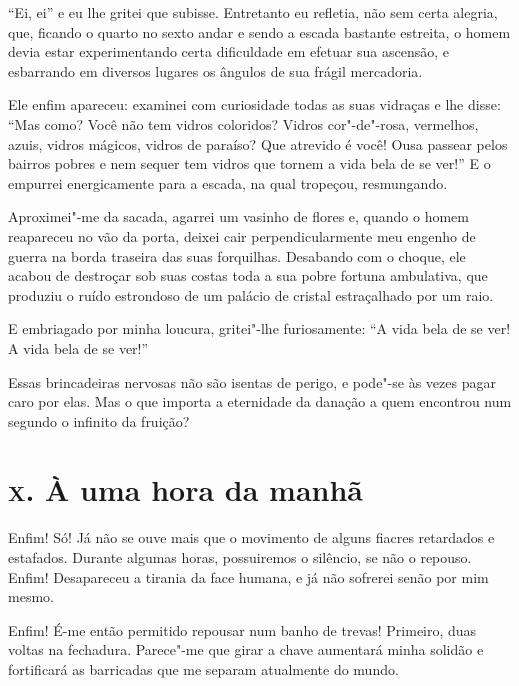 ``Ei, ei'' e eu lhe gritei que subisse.
Entretanto eu refletia, não sem certa alegria, que, ficando o quarto
no sexto andar e sendo a escada bastante estreita, o
homem devia estar experimentando certa dificuldade em efetuar sua
ascensão, e esbarrando em diversos lugares os ângulos de sua frágil
mercadoria.

Ele enfim apareceu: examinei com curiosidade todas as suas vidraças e
lhe disse: ``Mas como? Você não tem vidros coloridos?
Vidros cor"-de"-rosa, vermelhos, azuis, vidros mágicos, vidros de
paraíso? Que atrevido é você! Ousa passear pelos bairros pobres e nem
sequer tem vidros que tornem a vida bela de se ver!'' E
o empurrei energicamente para a escada, na qual tropeçou, resmungando.

Aproximei"-me da sacada, agarrei um vasinho de flores e, quando o
homem reapareceu no vão da porta, deixei cair perpendicularmente meu
engenho de guerra na borda traseira das suas forquilhas. Desabando
com o choque, ele acabou de destroçar sob suas costas toda a sua pobre
fortuna ambulativa, que produziu o ruído estrondoso de um palácio de
cristal estraçalhado por um raio.

E embriagado por minha loucura, gritei"-lhe furiosamente:
``A vida bela de se ver! A vida bela de se
ver!''

Essas brincadeiras nervosas não são isentas de perigo, e pode"-se às
vezes pagar caro por elas. Mas o que importa a eternidade da danação a
quem encontrou num segundo o infinito da fruição?

\chapter{\textsc{x.} À uma hora da manhã}

Enfim! Só! Já não se ouve mais que o movimento de alguns fiacres retardados
e estafados. Durante algumas horas, possuiremos o silêncio, se não o
repouso. Enfim! Desapareceu a tirania da face humana, e já não sofrerei
senão por mim mesmo.

Enfim! É-me então permitido repousar num banho de trevas! Primeiro, duas
voltas na fechadura. Parece"-me que girar a chave aumentará minha
solidão e fortificará as barricadas que me separam atualmente do mundo.

